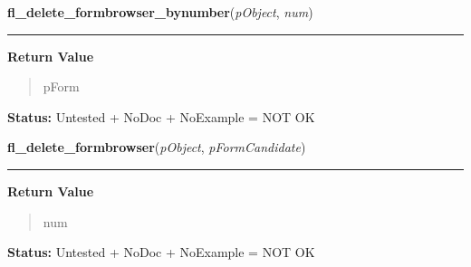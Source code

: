     \vspace{0.5ex}

\hspace{.8\funcindent}\begin{boxedminipage}{\funcwidth}

    \raggedright \textbf{fl\_delete\_formbrowser\_bynumber}(\textit{pObject}, \textit{num})

    \vspace{-1.5ex}

    \rule{\textwidth}{0.5\fboxrule}
\setlength{\parskip}{2ex}
\setlength{\parskip}{1ex}
      \textbf{Return Value}
    \vspace{-1ex}

      \begin{quote}
      pForm

      \end{quote}

\textbf{Status:} Untested + NoDoc + NoExample = NOT OK



    \end{boxedminipage}

    \label{xformslib:library:fl_delete_formbrowser}

    \vspace{0.5ex}

\hspace{.8\funcindent}\begin{boxedminipage}{\funcwidth}

    \raggedright \textbf{fl\_delete\_formbrowser}(\textit{pObject}, \textit{pFormCandidate})

    \vspace{-1.5ex}

    \rule{\textwidth}{0.5\fboxrule}
\setlength{\parskip}{2ex}
\setlength{\parskip}{1ex}
      \textbf{Return Value}
    \vspace{-1ex}

      \begin{quote}
      num

      \end{quote}

\textbf{Status:} Untested + NoDoc + NoExample = NOT OK



    \end{boxedminipage}

    \label{xformslib:library:fl_replace_formbrowser}


